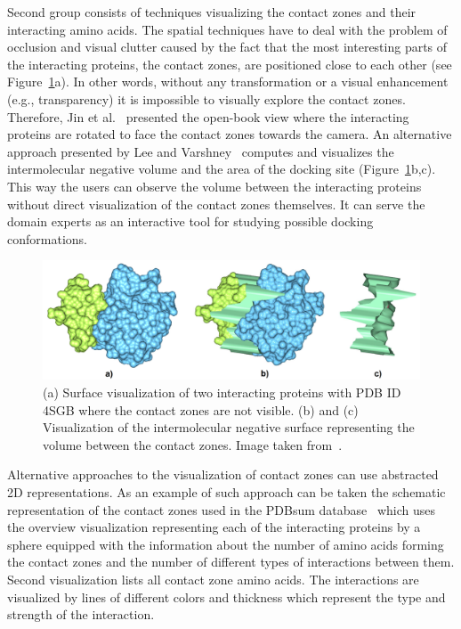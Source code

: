 \documentclass[journal]{vgtc}                %
\begin{document}
Second group consists of techniques visualizing the contact zones and their interacting amino acids.
The spatial techniques have to deal with the problem of occlusion and visual clutter caused by the fact that the most interesting parts of the interacting proteins, the contact zones, are positioned close to each other (see Figure~\ref{fig:varshney}a).
In other words, without any transformation or a visual enhancement (e.g., transparency) it is impossible to visually explore the contact zones.
Therefore, Jin et al.~\cite{Jin2014} presented the open-book view where the interacting proteins are rotated to face the contact zones towards the camera.
An alternative approach presented by Lee and Varshney~\cite{Varshney2003} computes and visualizes the intermolecular negative volume and the area of the docking site (Figure~\ref{fig:varshney}b,c).
This way the users can observe the volume between the interacting proteins without direct visualization of the contact zones themselves.
It can serve the domain experts as an interactive tool for studying possible docking conformations.

\begin{figure}[bt]
  \centering
  \includegraphics[width=1.0\columnwidth]{varshney.png}
  \caption{(a) Surface visualization of two interacting proteins with PDB ID 4SGB where the contact zones are not visible. (b) and (c) Visualization of the intermolecular negative surface representing the volume between the contact zones. Image taken from~\cite{Varshney2003}.}
  \label{fig:varshney}
\end{figure}

Alternative approaches to the visualization of contact zones can use abstracted 2D representations.
As an example of such approach can be taken the schematic representation of the contact zones used in the PDBsum database~\cite{pdbsum} which uses the overview visualization representing each of the interacting proteins by a sphere equipped with the information about the number of amino acids forming the contact zones and the number of different types of interactions between them.
Second visualization lists all contact zone amino acids. 
The interactions are visualized by lines of different colors and thickness which represent the type and strength of the interaction.
\end{document}
